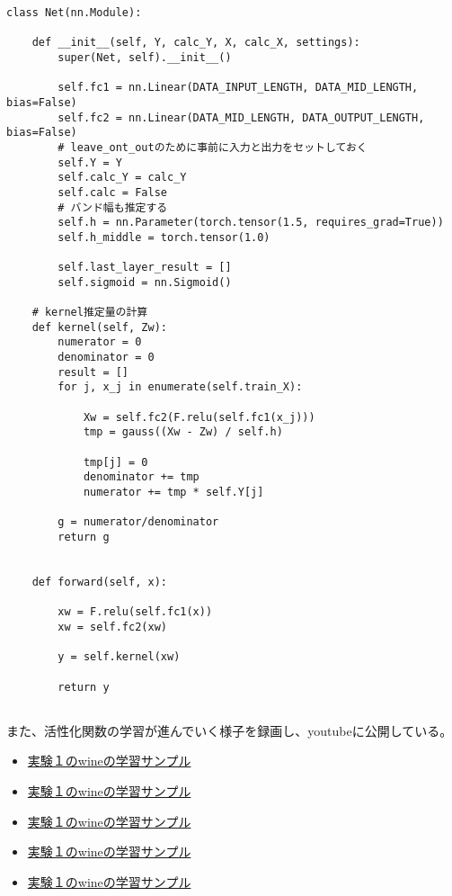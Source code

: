\begin{lstlisting}[caption=Pytorchを用いたK-AFの計算用のクラス,label=python_impl]
class Net(nn.Module):

    def __init__(self, Y, calc_Y, X, calc_X, settings):
        super(Net, self).__init__()

        self.fc1 = nn.Linear(DATA_INPUT_LENGTH, DATA_MID_LENGTH, bias=False)
        self.fc2 = nn.Linear(DATA_MID_LENGTH, DATA_OUTPUT_LENGTH, bias=False)
        # leave_ont_outのために事前に入力と出力をセットしておく
        self.Y = Y
        self.calc_Y = calc_Y
        self.calc = False
        # バンド幅も推定する
        self.h = nn.Parameter(torch.tensor(1.5, requires_grad=True))
        self.h_middle = torch.tensor(1.0)

        self.last_layer_result = []
        self.sigmoid = nn.Sigmoid()

    # kernel推定量の計算
    def kernel(self, Zw):
        numerator = 0
        denominator = 0
        result = []
        for j, x_j in enumerate(self.train_X):

            Xw = self.fc2(F.relu(self.fc1(x_j)))
            tmp = gauss((Xw - Zw) / self.h)

            tmp[j] = 0
            denominator += tmp
            numerator += tmp * self.Y[j]

        g = numerator/denominator
        return g


    def forward(self, x):

        xw = F.relu(self.fc1(x))
        xw = self.fc2(xw)

        y = self.kernel(xw)

        return y


\end{lstlisting}

また、活性化関数の学習が進んでいく様子を録画し、youtubeに公開している。



\begin{itemize}
  \item \href{https://github.com/latte0/graduation\_thesis}{実験１のwineの学習サンプル}
  \item \href{https://github.com/latte0/graduation\_thesis}{実験１のwineの学習サンプル}
  \item \href{https://github.com/latte0/graduation\_thesis}{実験１のwineの学習サンプル}
  \item \href{https://github.com/latte0/graduation\_thesis}{実験１のwineの学習サンプル}
  \item \href{https://github.com/latte0/graduation\_thesis}{実験１のwineの学習サンプル}
\end{itemize}


